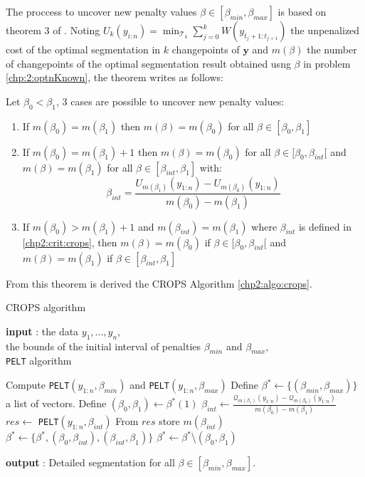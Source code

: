 The proccess to uncover new penalty values $\beta \in [\beta_{min},\beta_{max}]$ is based on theorem 3 of \cite{haynes2017}. Noting $U_k(y_{i:n}) = \min_{\mathcal{T}_k} \sum_{j = 0}^k W(y _{t_j+1:t_{j+1}})$ the unpenalized cost of the optimal segmentation in $k$ changepoints of $\bm y$ and $m(\beta)$ the number of changepoints of the optimal segmentation result obtained usng $\beta$ in problem \ref{chp:2:optnKnown}, the theorem writes as follows:

\begin{theorem}
Let $\beta_0 < \beta_1$, 3 cases are possible to uncover new penalty values:
\begin{enumerate}
  \item If $m(\beta_0) = m(\beta_1)$ then $m(\beta) = m(\beta_0)$ for all $\beta \in [\beta_0,\beta_1]$
  \item If $m(\beta_0) = m(\beta_1)+1$ then $m(\beta) = m(\beta_0)$ for all $\beta\in[\beta_0,\beta_{int}[$ and $m(\beta) = m(\beta_1)$ for all $\beta\in[\beta_{int},\beta_1]$ with:
  \begin{equation}\label{chp2:crit:crops}
    \beta_{int} = \frac{U_{m(\beta_1)}(y_{1:n})-U_{m(\beta_0)}(y_{1:n})}{m(\beta_0)-m(\beta_1)}
  \end{equation}
  \item If $m(\beta_0) > m(\beta_1)+1$ and $m(\beta_{int}) = m(\beta_1)$ where $\beta_{int}$ is defined in \ref{chp2:crit:crops}, then $m(\beta) = m(\beta_0)$ if $\beta\in[\beta_0,\beta_{int}[$ and $m(\beta) = m(\beta_1)$ if $\beta\in [\beta_{int},\beta_1]$
\end{enumerate}
\end{theorem} 

From this theorem is derived the CROPS Algorithm \ref{chp2:algo:crops}.  

\begin{algorithm}[ht]
\caption{CROPS algorithm}\label{chp2:algo:crops}
\begin{algorithmic}

\State \textbf{input} : the data $y_{1},...,y_{n}$, \\
the bounds of the initial interval of penalties $\beta_{min}$ and $\beta_{max}$, \\
\texttt{PELT} algorithm 
  
\State Compute \texttt{PELT}$(y_{1:n},\beta_{min})$ and \texttt{PELT}$(y_{1:n},\beta_{max})$ 
\State Define $\beta^* \gets \{(\beta_{min},\beta_{max})\}$ a list of vectors.  
\While{$\beta^*\neq \emptyset$}
  \State Define $(\beta_0, \beta_1) \gets \beta^*(1)$
    \State $\beta_{int} \gets \frac{\mathcal{Q}_{m(\beta_1)}(y_{1:n})-\mathcal{Q}_{m(\beta_0)}(y_{1:n})}{m(\beta_0)-m(\beta_1)}$
    \State $res \gets$ \texttt{PELT}$(y_{1:n},\beta_{int})$
    \State From $res$ store $m(\beta_{int})$
      \State $\beta^* \gets \{\beta^*,(\beta_0,\beta_{int}),(\beta_{int},\beta_1)\}$
    \EndIf
  \EndIf
  \State $\beta^* \gets \beta^*$\textbackslash$(\beta_0,\beta_1)$
\EndWhile 
   
\State \textbf{output} : Detailed segmentation for all $\beta \in [\beta_{min},\beta_{max}]$. 
\end{algorithmic}
\end{algorithm} 

